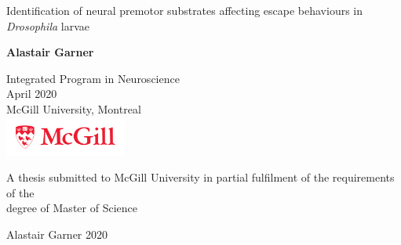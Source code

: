 \begin{titlepage}
  \begin{center}
    \vspace*{1cm}

    {\LARGE\textsf{Identification of neural premotor substrates affecting escape behaviours in \textit{Drosophila} larvae}\par}

    \vspace{2.0cm}
    
    {\large\textbf{Alastair Garner}\par}

    \vspace{2.0cm}
    
    Integrated Program in Neuroscience\\
    April 2020\\
    McGill University, Montreal\\

    \includegraphics[width=4cm]{./figures/mcgill_sig_red.png}

    \vfill

    {A thesis submitted to McGill University in partial fulfilment of the requirements of the\\
    degree of Master of Science \par}

    \vspace{0.2cm}

    {\textcopyright Alastair Garner 2020 \par}
  \end{center} 
\end{titlepage}
